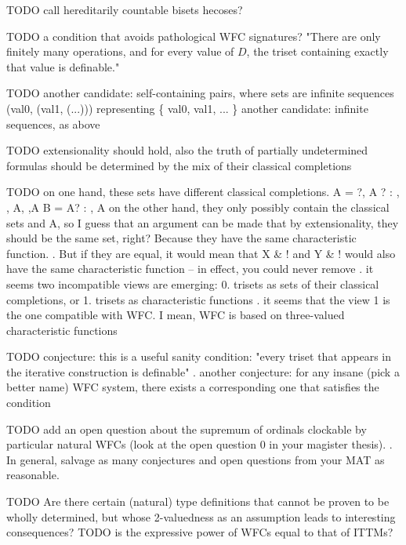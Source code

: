 \documentclass[oneside,12pt]{book}
\newcounter{question}
\theoremstyle{definition}
\theoremstyle{remark}
\begin{document}
TODO call hereditarily countable bisets hecoses?

TODO a condition that avoids pathological WFC signatures?
"There are only finitely many operations, and for every value of $D$,
the triset containing exactly that value is definable."

TODO another candidate: self-containing pairs, where sets are infinite
sequences (val0, (val1, (...))) representing \{ val0, val1, ... \}
another candidate: infinite sequences, as above

TODO extensionality should hold, also the truth of partially undetermined
formulas should be determined by the mix of their classical completions

TODO on one hand, these sets have different classical completions.
A = { {}?, { A }? }: {}, {{}}, {{A}}, {{},{A}}
B = { { A? } }     : {{}}, {{A}}
on the other hand, they only possibly contain the classical sets {} and {A},
so I guess that an argument can be made that by extensionality, they should
be the same set, right? Because they have the same characteristic function.
.
But if they are equal, it would mean that X \& !{{}} and Y \& !{{}} would also
have the same characteristic function -- in effect, you could never remove
.
it seems two incompatible views are emerging:
0. trisets as sets of their classical completions, or
1. trisets as characteristic functions
.
it seems that the view 1 is the one compatible with WFC. I mean, WFC
is based on three-valued characteristic functions

TODO conjecture: this is a useful sanity condition: "every triset that appears
in the iterative construction is definable"
.
another conjecture: for any insane (pick a better name)
WFC system, there exists a corresponding one that satisfies the condition

TODO add an open question about the supremum of ordinals clockable by particular
natural WFCs (look at the open question 0 in your magister thesis).
.
In general, salvage as many conjectures and open questions from your MAT as reasonable.

TODO Are there certain (natural) type definitions that
cannot be proven to be wholly determined, but whose 2-valuedness
as an assumption leads to interesting consequences?
TODO is the expressive power of WFCs equal to that of ITTMs?
\end{document}

